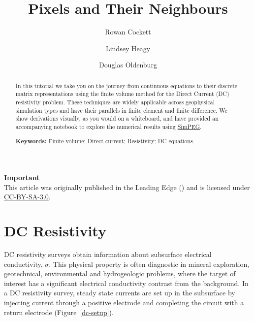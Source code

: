 \documentclass[Journal,InsideFigs,DoubleSpace,12pt,letterpaper]{ascelike-new}
\begin{document}
\title{Pixels and Their Neighbours}

\author[1]{Rowan Cockett}\author[1]{Lindsey Heagy}\author[1]{Douglas Oldenburg}

\maketitle

\begin{abstract}
In this tutorial we take you on the journey from continuous equations to their discrete matrix representations using the finite volume method for the Direct Current (DC) resistivity problem. These techniques are widely applicable across geophysical simulation types and have their parallels in finite element and finite difference. We show derivations visually, as you would on a whiteboard, and have provided an accompanying notebook to explore the numerical results using \href{http://simpeg.xyz/}{SimPEG}.

\noindent
\textbf{Keywords:} Finite volume; Direct current; Resistivity; DC equations.
\end{abstract}

\begin{framed}
\textbf{Important}\\
This article was originally published in the Leading Edge (\cite{Cockett_2016}) and is licensed under \href{https://creativecommons.org/licenses/by-sa/3.0/}{CC-BY-SA-3.0}.
\end{framed}

\section{DC Resistivity}\label{DC Resistivity}

DC resistivity surveys obtain information about subsurface electrical conductivity, $\sigma$. This physical property is often diagnostic in mineral exploration, geotechnical, environmental and hydrogeologic problems, where the target of interest has a significant electrical conductivity contrast from the background. In a DC resistivity survey, steady state currents are set up in the subsurface by injecting current through a positive electrode and completing the circuit with a return electrode (Figure~\ref{dc-setup}).
\end{document}
